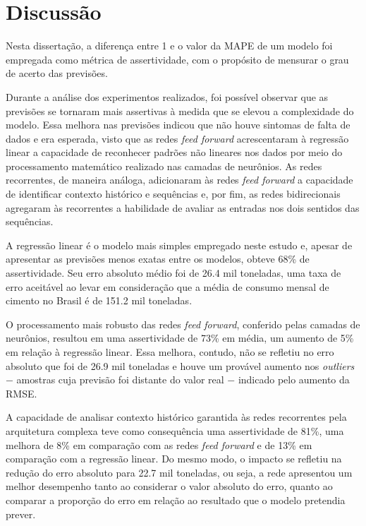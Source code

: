 
\chapter{Discussão}
\label{chap:discussao}

Nesta dissertação, a diferença entre 1 e o valor da MAPE de um 
modelo foi empregada como métrica de assertividade, com o propósito de 
mensurar o grau de acerto das previsões. 

Durante a análise dos experimentos realizados, foi possível observar que as previsões se tornaram mais assertivas à medida que se elevou a complexidade do modelo. Essa melhora nas previsões indicou que não houve sintomas de falta de dados e era esperada, visto que as redes \textit{feed forward} acrescentaram à regressão linear
a capacidade de reconhecer padrões não lineares nos dados por meio do 
processamento matemático realizado nas camadas de neurônios. As redes 
recorrentes, de maneira análoga, adicionaram às redes \textit{feed forward} a capacidade de identificar contexto histórico e sequências e, por fim, as redes bidirecionais agregaram às recorrentes a habilidade de avaliar as entradas nos dois sentidos das sequências. 

A regressão linear é o modelo mais simples empregado neste estudo e, apesar
de apresentar as previsões menos exatas entre os modelos, obteve 68\% de 
assertividade. Seu erro absoluto médio foi de 26.4 mil toneladas, uma taxa de erro aceitável ao levar em consideração que a média de consumo mensal de cimento no Brasil é de 151.2 mil toneladas.

O processamento mais robusto das redes \textit{feed forward}, conferido pelas 
camadas de neurônios, resultou em uma assertividade de 73\% em média, um aumento 
de 5\% em relação à regressão linear. Essa melhora, contudo, não se refletiu 
no erro absoluto que foi de 26.9 mil toneladas e houve um provável
aumento nos \textit{outliers} $-$ amostras cuja previsão foi distante do valor 
real $-$ indicado pelo aumento da RMSE.

A capacidade de analisar contexto histórico garantida às redes recorrentes pela 
arquitetura complexa teve como consequência uma assertividade de 81\%, uma melhora 
de 8\% em comparação com as redes \textit{feed forward} e de 13\% em comparação 
com a regressão linear. Do mesmo modo, o impacto se refletiu na redução do  erro absoluto para 22.7 mil toneladas, ou seja, a rede apresentou um melhor desempenho 
tanto ao considerar o valor absoluto do erro, quanto 
ao comparar a proporção do erro em relação ao resultado que o modelo pretendia prever.

